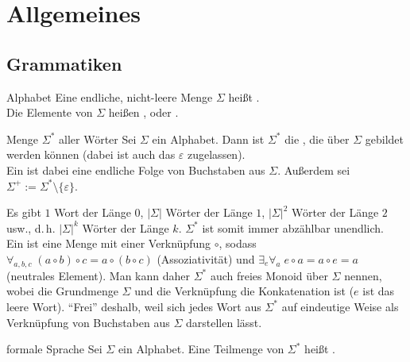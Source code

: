 \section{%
    Allgemeines%
}

\subsection{%
    Grammatiken%
}

\begin{Def}{Alphabet}
    Eine endliche, nicht-leere Menge $\Sigma$ heißt .\\
    Die Elemente von $\Sigma$ heißen ,
     oder .
\end{Def}

\begin{Def}{Menge $\Sigma^\ast$ aller Wörter}
    Sei $\Sigma$ ein Alphabet.
    Dann ist $\Sigma^\ast$ die ,
    die über $\Sigma$ gebildet werden können
    (dabei ist auch das  $\varepsilon$ zugelassen).\\
    Ein  ist dabei eine endliche Folge von
    Buchstaben aus $\Sigma$.
    Außerdem sei $\Sigma^+ := \Sigma^\ast \setminus \{\varepsilon\}$.
\end{Def}

\begin{Bem}
    Es gibt $1$ Wort der Länge $0$, $|\Sigma|$ Wörter der Länge $1$,
    $|\Sigma|^2$ Wörter der Länge $2$ usw., d.\,h.
    $|\Sigma|^k$ Wörter der Länge $k$.
    $\Sigma^\ast$ ist somit immer abzählbar unendlich.\\
    Ein  ist eine Menge mit einer Verknüpfung $\circ$, sodass
    $\forall_{a, b, c}\; (a \circ b) \circ c = a \circ (b \circ c)$
    (Assoziativität) und $\exists_{e} \forall_{a}\; e \circ a = a \circ e = a$
    (neutrales Element).
    Man kann daher $\Sigma^\ast$ auch freies Monoid über $\Sigma$ nennen,
    wobei die Grundmenge $\Sigma$ und die Verknüpfung die Konkatenation ist
    ($e$ ist das leere Wort).
    "`Frei"' deshalb, weil sich jedes Wort aus $\Sigma^\ast$ auf eindeutige
    Weise als Verknüpfung von Buchstaben aus $\Sigma$ darstellen lässt.
\end{Bem}

\begin{Def}{formale Sprache}
    Sei $\Sigma$ ein Alphabet.
    Eine Teilmenge von $\Sigma^\ast$ heißt .
\end{Def}

